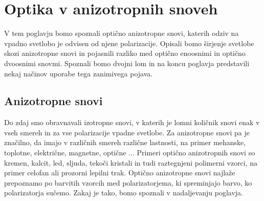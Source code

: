 
\chapter{Optika v anizotropnih snoveh}
\label{chap:AnizotropneSnovi}
V tem poglavju bomo spoznali optično anizotropne snovi, katerih odziv na 
vpadno svetlobo je odvisen od njene polarizacije. Opisali bomo 
širjenje svetlobe skozi anizotropne snovi in pojasnili razliko med optično 
enoosnimi in optično dvoosnimi snovmi. Spoznali bomo dvojni lom in 
na koncu poglavja predstavili nekaj načinov uporabe tega zanimivega pojava.

\section{Anizotropne snovi}
Do zdaj smo obravnavali izotropne snovi, v katerih je lomni količnik 
snovi enak v vseh smereh in za vse polarizacije vpadne svetlobe. 
Za anizotropne snovi pa je značilno, da imajo 
v različnih smereh različne lastnosti, na primer mehanske, toplotne, 
električne, magnetne, optične ... Primeri optično 
anizotropnih snovi so kremen, kalcit, led, sljuda, tekoči kristali
in tudi raztegnjeni polimerni vzorci, na primer celofan ali prozorni lepilni trak. 
Optično anizotropne snovi najlaže prepoznamo po barvitih vzorcih med
polarizatorjema, ki spreminjajo barvo, ko polarizatorja sučemo. 
Zakaj je tako, bomo spoznali v nadaljevanju poglavja.
